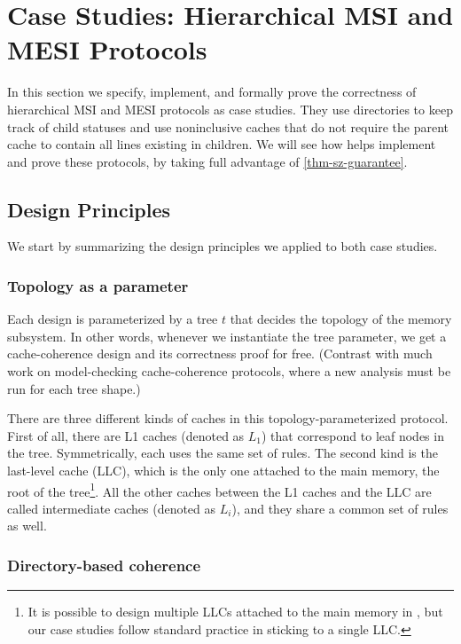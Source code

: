 \documentclass[sigplan,10pt,review,anonymous,screen]{acmart}\settopmatter{printfolios=true,printccs=false,printacmref=false}
\begin{document}
\section{Case Studies: Hierarchical MSI and MESI Protocols}
\label{sec-case-study}

In this section we specify, implement, and formally prove the correctness of hierarchical MSI and MESI protocols as case studies.
They use directories to keep track of child statuses and use noninclusive caches that do not require the parent cache to contain all lines existing in children.
We will see how \hemiola{} helps implement and prove these protocols, by taking full advantage of \autoref{thm-sz-guarantee}.

\subsection{Design Principles}
We start by summarizing the design principles we applied to both case studies.

\subsubsection{Topology as a parameter}
\label{sec-topo-param}
Each design is parameterized by a tree $t$ that decides the topology of the memory subsystem.
In other words, whenever we instantiate the tree parameter, we get a cache-coherence design and its correctness proof for free.
(Contrast with much work on model-checking cache-coherence protocols, where a new analysis must be run for each tree shape.)

There are three different kinds of caches in this topology-parameterized protocol.
First of all, there are L1 caches (denoted as $L_1$) that correspond to leaf nodes in the tree.
Symmetrically, each uses the same set of rules.
The second kind is the last-level cache (LLC), which is the only one attached to the main memory, the root of the tree\footnote{It is possible to design multiple LLCs attached to the main memory in \hemiola{}, but our case studies follow standard practice in sticking to a single LLC.}.
All the other caches between the L1 caches and the LLC are called intermediate caches (denoted as $L_i$), and they share a common set of rules as well.

\subsubsection{Directory-based coherence}
\end{document}
